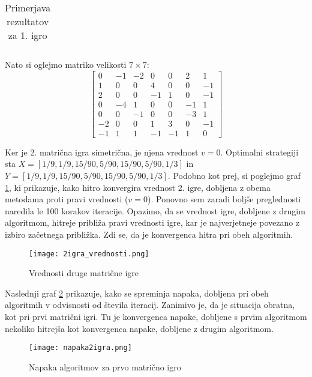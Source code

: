 \documentclass[a4paper,12pt]{article}
\begin{document}
\begin{table}[]
{\begin{tabular}{c|llll|llll|}
    \end{tabular}}
    \caption{Primerjava rezultatov za 1. igro}
    \label{table:1igra}
    \end{table} 
Nato si oglejmo matriko velikosti $7 \times 7$:
\begin{equation*}
\begin{bmatrix}
    0 & -1 & -2 & 0 & 0 & 2 & 1\\
    1 & 0 & 0 & 4  & 0 & 0 & -1\\
    2 & 0 & 0 & -1 & 1 & 0 & -1\\
    0 &-4 & 1 & 0 & 0 & -1 & 1\\
    0 & 0 & -1 & 0 & 0 & -3 & 1\\
    -2 & 0 & 0 & 1 & 3 & 0 & -1\\
    -1 & 1 & 1 & -1 & -1 & 1 & 0 
\end{bmatrix}
\end{equation*}

Ker je 2. matrična igra simetrična, je njena vrednost $v = 0$. Optimalni strategiji sta 
$X = [1/9, 1/9, 15/90, 5/90, 15/90, 5 / 90, 1 /3]$ in 
$Y = [1 / 9, 1 / 9, 15/90, 5 / 90, 15 / 90,  5 / 90, 1 /3]$. 
Podobno kot prej, si poglejmo graf \ref{fig:vred2}, ki prikazuje, kako hitro konvergira
 vrednost 2. igre, 
dobljena z obema metodama proti pravi vrednosti ($v = 0$). Ponovno sem zaradi boljše preglednosti
naredila le
100 korakov iteracije. Opazimo, da se vrednost igre, dobljene z drugim algoritmom, hitreje približa
pravi vrednosti igre, kar je najverjetneje povezano z izbiro začetnega približka. Zdi se, da je konvergenca hitra
pri obeh algoritmih.
\begin{figure}
    \centering
    \texttt{[image: 2igra\_vrednosti.png]}
    \caption{Vrednosti druge matrične igre}
    \label{fig:vred2}
  \end{figure}

Naslednji graf \ref{fig:napaka2} prikazuje, kako se spreminja napaka, dobljena pri obeh algoritmih v odvisnosti od števila iteracij. Zanimivo je, da
je situacija obratna, kot pri prvi matrični igri. Tu je konvergenca napake, dobljene s prvim algoritmom nekoliko hitrejša kot konvergenca napake, dobljene z drugim algoritmom.
  \begin{figure}
    \centering
    \texttt{[image: napaka2igra.png]}
    \caption{Napaka algoritmov za prvo matrično igro}
    \label{fig:napaka2}
  \end{figure}
\end{document}
